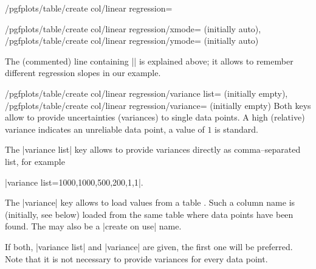 {\begin{stylekey}{/pgfplots/table/create col/linear regression=}
\begin{keylist}{%
		/pgfplots/table/create col/linear regression/xmode= (initially auto),
		/pgfplots/table/create col/linear regression/ymode= (initially auto)}
\begin{codeexample}[]
\end{codeexample}

	The (commented) line containing |\slope| is explained above; it allows to remember different regression slopes in our example.
	\end{keylist}

	\begin{keylist}{%
		/pgfplots/table/create col/linear regression/variance list= (initially empty),%
		/pgfplots/table/create col/linear regression/variance= (initially empty)%
	}
	Both keys allow to provide uncertainties (variances) to single data points.
	A high (relative) variance indicates an unreliable data point, a value of $1$ is standard.

	The |variance list| key allows to provide variances directly as comma--separated list, for example

	|variance list={1000,1000,500,200,1,1}|.

	The |variance| key allows to load values from a table . Such a column name is (initially, see below) loaded from the same table where data points have been found. The  may also be a |create on use| name.
\begin{codeexample}[]
\end{codeexample}

	If both, |variance list| and |variance| are given, the first one will be preferred. Note that it is not necessary to provide variances for every data point.
	\end{keylist}


\end{stylekey}}
